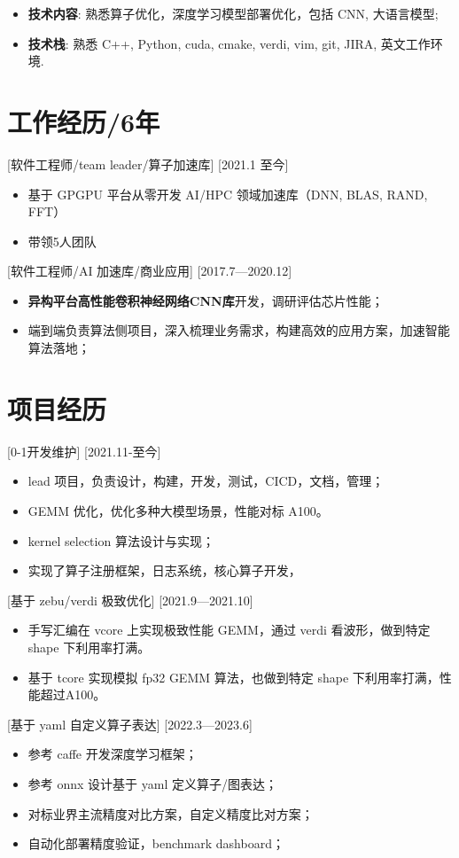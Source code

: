 \documentclass{resume}
\begin{document}
\begin{itemize}
  \item \textbf{技术内容}: 熟悉算子优化，深度学习模型部署优化，包括 CNN, 大语言模型;
  \item \textbf{技术栈}: 熟悉 C++, Python, cuda, cmake, verdi, vim, git, JIRA, 英文工作环境.
\end{itemize}

\section{工作经历/6年}

[软件工程师/team leader/算子加速库]
[2021.1 至今]

\begin{itemize}
  \item 基于 GPGPU 平台从零开发 AI/HPC 领域加速库（DNN, BLAS, RAND, FFT）
  \item 带领5人团队
\end{itemize}

[软件工程师/AI 加速库/商业应用]
[2017.7—2020.12] 

\begin{itemize}
  \item \textbf{异构平台高性能卷积神经网络CNN库}开发，调研评估芯片性能；
  \item 端到端负责算法侧项目，深入梳理业务需求，构建高效的应用方案，加速智能算法落地；
\end{itemize}

\section{项目经历}

[0-1开发维护]
[2021.11-至今]
\begin{itemize}
  \item lead 项目，负责设计，构建，开发，测试，CICD，文档，管理；
  \item GEMM 优化，优化多种大模型场景，性能对标 A100。
  \item kernel selection 算法设计与实现；
  \item 实现了算子注册框架，日志系统，核心算子开发，
\end{itemize}

[基于 zebu/verdi 极致优化]
[2021.9—2021.10]

\begin{itemize}
  \item 手写汇编在 vcore 上实现极致性能 GEMM，通过 verdi 看波形，做到特定 shape 下利用率打满。
  \item 基于 tcore 实现模拟 fp32 GEMM 算法，也做到特定 shape 下利用率打满，性能超过A100。
\end{itemize}

[基于 yaml 自定义算子表达]
[2022.3—2023.6]

\begin{itemize}
  \item 参考 caffe 开发深度学习框架；
  \item 参考 onnx 设计基于 yaml 定义算子/图表达；
  \item 对标业界主流精度对比方案，自定义精度比对方案；
  \item 自动化部署精度验证，benchmark dashboard；
\end{itemize}
\end{document}
